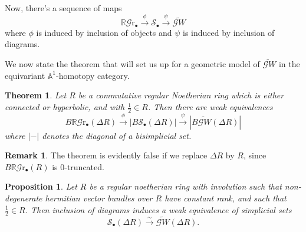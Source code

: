 \documentclass[draftthesis,tocnosub,noragright,centerchapter,10pt]{uiucthesis2009}
\newcommand{\mbb}{\mathbb}
\newcommand{\hRGr}{\mathbb R\mathscr{G}{\mathrm{r}}}
\theoremstyle{plain}
\newtheorem{theorem}[lemma]{Theorem}
\newtheorem{proposition}[lemma]{Proposition}
\theoremstyle{definition}
\newtheorem{remark}[lemma]{Remark}
\begin{document}
Now, there's a sequence of maps
\[
\hRGr_\bullet \xrightarrow{\phi} \mathscr S_\bullet \xrightarrow{\psi}
\widetilde{\mathscr GW}
\]
where $\phi$ is induced by inclusion of objects and $\psi$ is induced
by inclusion of diagrams. 

We now state the theorem that will set us up for a geometric model of
$\widetilde{\mathscr GW}$ in the equivariant $\mbb A^1$-homotopy
category. 

\begin{theorem}
Let $R$ be a commutative regular Noetherian ring which is either
connected or hyperbolic, and with
$\frac{1}{2} \in R$. Then there are weak equivalences
\[
B\hRGr_\bullet(\Delta R) \xrightarrow{\phi} |B\mathscr S_\bullet(\Delta R)| \xrightarrow{\psi}
|B\widetilde{\mathscr GW}(\Delta R)|
\]
where $| - |$ denotes the diagonal of a bisimplicial set. 
\end{theorem}

\begin{remark}
The theorem is evidently false if we replace $\Delta R$ by $R$, since
$B\hRGr_\bullet(R)$ is 0-truncated. 
\end{remark}

\begin{proposition}
Let $R$ be a regular noetherian ring with involution such that
non-degenerate hermitian vector bundles over $R$ have constant rank,
and such that $\frac{1}{2} \in R$. Then inclusion of diagrams induces
a weak equivalence of simplicial sets
\[
\mathscr S_\bullet(\Delta R) \xrightarrow{\sim} \widetilde{\mathscr{G}W}(\Delta R).
\]
\end{proposition}
\end{document}
